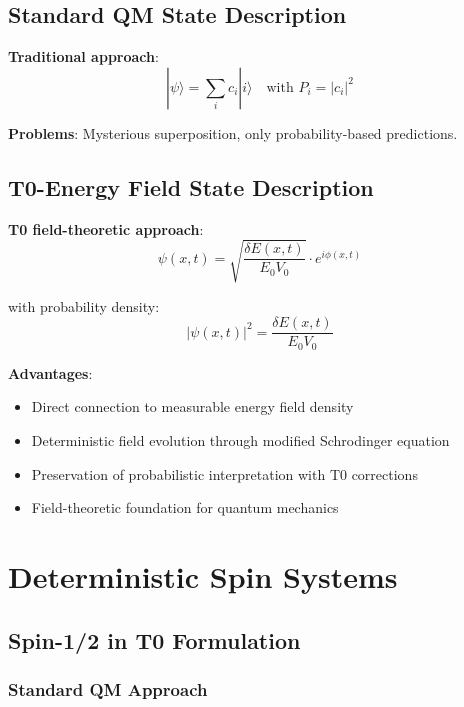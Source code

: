 \documentclass[12pt,a4paper]{article}
\begin{document}
	\subsection{Standard QM State Description}
	
	\textbf{Traditional approach}:
	\begin{equation}
		|\psi\rangle = \sum_i c_i |i\rangle \quad \text{with } P_i = |c_i|^2
	\end{equation}
	
	\textbf{Problems}: Mysterious superposition, only probability-based predictions.
	
	\subsection{T0-Energy Field State Description}
	
	\textbf{T0 field-theoretic approach}:
	\begin{equation}
		\boxed{\psi(x,t) = \sqrt{\frac{\delta E(x,t)}{E_0 V_0}} \cdot e^{i\phi(x,t)}}
		\label{eq:wavefunction_field}
	\end{equation}
	
	with probability density:
	\begin{equation}
		\boxed{|\psi(x,t)|^2 = \frac{\delta E(x,t)}{E_0 V_0}}
		\label{eq:probability_density}
	\end{equation}
	
	\textbf{Advantages}: 
	\begin{itemize}
		\item Direct connection to measurable energy field density
		\item Deterministic field evolution through modified Schrodinger equation
		\item Preservation of probabilistic interpretation with T0 corrections
		\item Field-theoretic foundation for quantum mechanics
	\end{itemize}
	
	\section{Deterministic Spin Systems}
	
	\subsection{Spin-1/2 in T0 Formulation}
	
	\subsubsection{Standard QM Approach}
	
\end{document}
